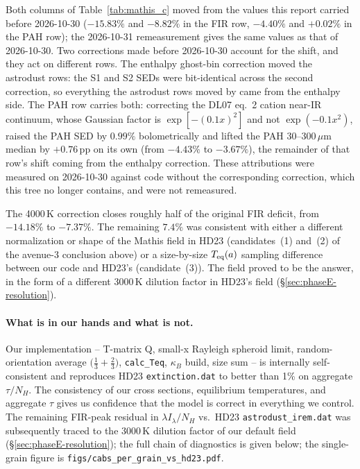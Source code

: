 \documentclass{my_memo}
\begin{document}
Both columns of Table~\ref{tab:mathis_c} moved from the values this
report carried before 2026-10-30 ($-15.83\%$ and $-8.82\%$ in the FIR
row, $-4.40\%$ and $+0.02\%$ in the PAH row); the 2026-10-31
remeasurement gives the same values as that of 2026-10-30. Two
corrections made before 2026-10-30 account for the shift, and they act
on different rows. The enthalpy ghost-bin correction moved the
astrodust rows: the S1 and S2 SEDs were bit-identical across the second
correction, so everything the astrodust rows moved by came from the
enthalpy side. The PAH row carries both: correcting the DL07 eq.~2
cation near-IR continuum, whose Gaussian factor is $\exp[-(0.1x)^2]$
and not $\exp(-0.1x^2)$, raised the PAH SED by $0.99\%$ bolometrically
and lifted the PAH 30--300\,$\mu$m median by $+0.76$\,pp on its own
(from $-4.43\%$ to $-3.67\%$), the remainder of that row's shift coming
from the enthalpy correction. These attributions were measured on
2026-10-30 against code without the corresponding correction, which
this tree no longer contains, and were not remeasured.

The 4000\,K correction closes roughly half of the original FIR
deficit, from $-14.18\%$ to $-7.37\%$. The remaining $7.4\%$ was
consistent with either a different normalization or shape of the
Mathis field in HD23 (candidates~(1) and~(2) of the avenue-3
conclusion above) or a size-by-size $T_{\rm eq}(a)$ sampling
difference between our code and HD23's (candidate~(3)). The field
proved to be the answer, in the form of a different 3000\,K dilution
factor in HD23's field (\S\ref{sec:phaseE-resolution}).

\paragraph{What is in our hands and what is not.} Our
implementation -- T-matrix Q, small-x Rayleigh spheroid limit,
random-orientation average $\bigl(\tfrac{1}{3} + \tfrac{2}{3}\bigr)$,
\texttt{calc\_Teq}, $\kappa_B$ build, size sum -- is internally
self-consistent and reproduces HD23 \texttt{extinction.dat} to better
than 1\% on aggregate $\tau/N_H$. The consistency of our cross
sections, equilibrium temperatures, and aggregate $\tau$ gives us
confidence that the model is correct in everything we control. The
remaining FIR-peak residual in $\lambda I_\lambda / N_H$ vs.\ HD23
\texttt{astrodust\_irem.dat} was subsequently traced to the 3000\,K
dilution factor of our default field (\S\ref{sec:phaseE-resolution}); the full
chain of diagnostics is given below; the single-grain figure is
\texttt{figs/cabs\_per\_grain\_vs\_hd23.pdf}.
\end{document}
